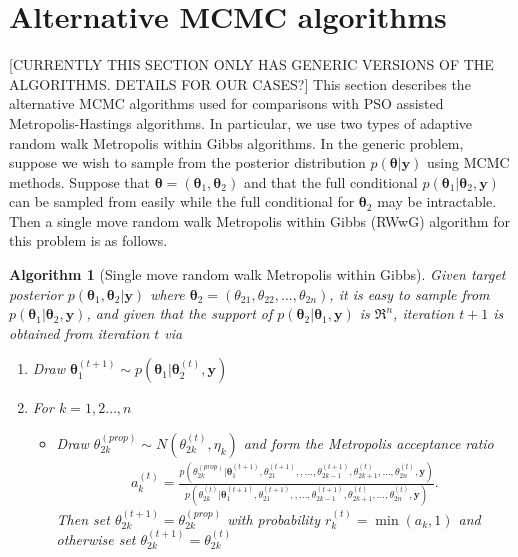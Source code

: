 \documentclass[12pt]{article}
\newtheorem{alg}{Algorithm}
\begin{document}
\section{Alternative MCMC algorithms}\label{app:altmcmc}
[CURRENTLY THIS SECTION ONLY HAS GENERIC VERSIONS OF THE ALGORITHMS. DETAILS FOR OUR CASES?]
This section describes the alternative MCMC algorithms used for comparisons with PSO assisted Metropolis-Hastings algorithms. In particular, we use two types of adaptive random walk Metropolis within Gibbs algorithms. In the generic problem, suppose we wish to sample from the posterior distribution $p(\bm{\theta}|\bm{y})$ using MCMC methods. Suppose that $\bm{\theta} = (\bm{\theta}_1, \bm{\theta}_2)$ and that the full conditional $p(\bm{\theta}_1|\bm{\theta}_2, \bm{y})$ can be sampled from easily while the full conditional for $\bm{\theta}_2$ may be intractable. Then a single move random walk Metropolis within Gibbs (RWwG) algorithm for this problem is as follows.
\begin{alg}[Single move random walk Metropolis within Gibbs]\label{alg:RWwG}
Given target posterior $p(\bm{\theta}_1,\bm{\theta}_2|\bm{y})$ where $\bm{\theta}_2=(\theta_{21},\theta_{22},\dots,\theta_{2n})$, it is easy to sample from $p(\bm{\theta}_1|\bm{\theta}_2,\bm{y})$, and given that the support of $p(\bm{\theta}_{2}|\bm{\theta}_1,\bm{y})$ is $\Re^n$, iteration $t+1$ is obtained from iteration $t$ via
\begin{enumerate}
\item Draw $\bm{\theta}_1^{(t+1)} \sim p(\bm{\theta}_1|\bm{\theta}_2^{(t)},\bm{y})$
\item For $k=1,2\dots,n$
\begin{itemize}
\item[] Draw $\theta_{2k}^{(prop)} \sim N(\theta_{2k}^{(t)}, \eta_k)$ and form the Metropolis acceptance ratio
\begin{align*}
a_k^{(t)} = \frac{p(\theta_{2k}^{(prop)}|\bm{\theta}_1^{(t+1)},\theta_{21}^{(t+1)},,\dots,\theta_{2k-1}^{(t+1)},\theta_{2k+1}^{(t)},\dots,\theta_{2n}^{(t)},\bm{y})}{p(\theta_{2k}^{(t)}|\bm{\theta}_1^{(t+1)},\theta_{21}^{(t+1)},,\dots,\theta_{2k-1}^{(t+1)},\theta_{2k+1}^{(t)},\dots,\theta_{2n}^{(t)},\bm{y})}.
\end{align*}
Then set $\theta_{2k}^{(t+1)}=\theta_{2k}^{(prop)}$ with probability $r_k^{(t)}=\min(a_k, 1)$ and otherwise set $\theta_{2k}^{(t+1)} = \theta_{2k}^{(t)}$
\end{itemize}
\end{enumerate}
\end{alg}
\end{document}
